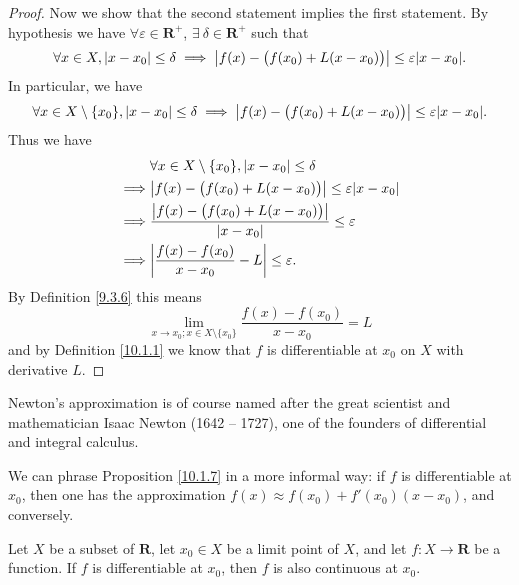 \begin{proof}
    Now we show that the second statement implies the first statement.
    By hypothesis we have \(\forall \varepsilon \in \mathbf{R}^+\), \(\exists\ \delta \in \mathbf{R}^+\) such that
    \[
        \forall x \in X, \abs*{x - x_0} \leq \delta \implies \abs*{f(x) - \big(f(x_0) + L(x - x_0)\big)} \leq \varepsilon \abs*{x - x_0}.
    \]
    In particular, we have
    \[
        \forall x \in X \setminus \{x_0\}, \abs*{x - x_0} \leq \delta \implies \abs*{f(x) - \big(f(x_0) + L(x - x_0)\big)} \leq \varepsilon \abs*{x - x_0}.
    \]
    Thus we have
    \begin{align*}
                 & \forall x \in X \setminus \{x_0\}, \abs*{x - x_0} \leq \delta                       \\
        \implies & \abs*{f(x) - \big(f(x_0) + L(x - x_0)\big)} \leq \varepsilon \abs*{x - x_0}         \\
        \implies & \frac{\abs*{f(x) - \big(f(x_0) + L(x - x_0)\big)}}{\abs*{x - x_0}} \leq \varepsilon \\
        \implies & \abs*{\frac{f(x) - f(x_0)}{x - x_0} - L} \leq \varepsilon.
    \end{align*}
    By Definition \ref{9.3.6} this means
    \[
        \lim_{x \to x_0 ; x \in X \setminus \{x_0\}} \frac{f(x) - f(x_0)}{x - x_0} = L
    \]
    and by Definition \ref{10.1.1} we know that \(f\) is differentiable at \(x_0\) on \(X\) with derivative \(L\).
\end{proof}

\begin{remark}\label{10.1.8}
    Newton's approximation is of course named after the great scientist and mathematician Isaac Newton (1642 -- 1727), one of the founders of differential and integral calculus.
\end{remark}

\begin{remark}\label{10.1.9}
    We can phrase Proposition \ref{10.1.7} in a more informal way:
    if \(f\) is differentiable at \(x_0\), then one has the approximation \(f(x) \approx f(x_0) + f'(x_0)(x - x_0)\), and conversely.
\end{remark}

\begin{proposition}\label{10.1.10}
    Let \(X\) be a subset of \(\mathbf{R}\), let \(x_0 \in X\) be a limit point of \(X\), and let \(f : X \to \mathbf{R}\) be a function.
    If \(f\) is differentiable at \(x_0\), then \(f\) is also continuous at \(x_0\).
\end{proposition}

